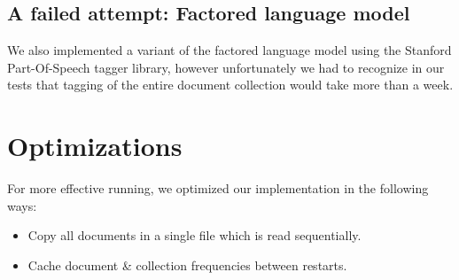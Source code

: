 \documentclass[12pt]{article}
\begin{document}
\subsection{A failed attempt: Factored language model}
We also implemented a variant of the factored language model using the Stanford Part-Of-Speech tagger library, however unfortunately we had to recognize in our tests that tagging of the entire document collection would take more than a week.

\section{Optimizations}
For more effective running, we optimized our implementation in the following ways:
\begin{itemize}
	\item Copy all documents in a single file which is read sequentially.
	\item Cache document \& collection frequencies between restarts.
\end{itemize}
\end{document}

